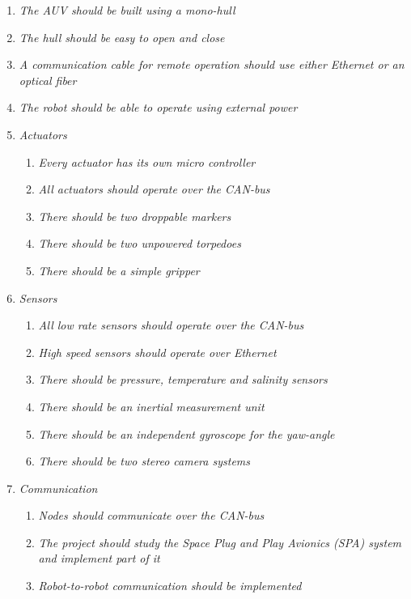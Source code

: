 \begin{enumerate}
   \item { \em The AUV should be built using a mono-hull}
   \item { \em The hull should be easy to open and close}
   \item { \em A communication cable for remote operation should use either Ethernet or 		an optical fiber}
   \item { \em The robot should be able to operate using external power}
   \item { \em Actuators} 
   \begin{enumerate}
   		\item { \em Every actuator has its own micro controller} 
   		\item { \em All actuators should operate over the CAN-bus} 
   		\item { \em There should be two droppable markers} 
   		\item { \em There should be two unpowered torpedoes} 
   		\item { \em There should be a simple gripper} 
   \end{enumerate}
   \item { \em Sensors}
   \begin{enumerate}
   		\item { \em All low rate sensors should operate over the CAN-bus} 
   		\item { \em High speed sensors should operate over Ethernet} 
   		\item { \em There should be pressure, temperature and salinity sensors} 
   		\item { \em There should be an inertial measurement unit} 
   		\item { \em There should be an independent gyroscope for the yaw-angle} 
   		\item { \em There should be two stereo camera systems}  
   \end{enumerate}
   \item { \em Communication} 
   \begin{enumerate}
   		\item { \em Nodes should communicate over the CAN-bus} 
   		\item { \em The project should study the Space Plug and Play Avionics
				(SPA) system and implement part of it} 
		\item { \em Robot-to-robot communication should be implemented} 		
   \end{enumerate}

\end{enumerate}
